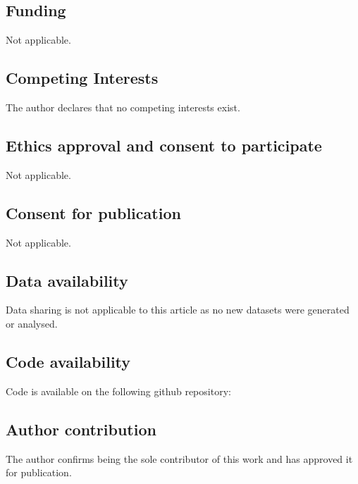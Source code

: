 \documentclass[pdflatex,sn-mathphys-ay]{sn-jnl}
\begin{document}
\subsection*{Funding}
Not applicable.

\subsection*{Competing Interests}
The author declares that no competing interests exist.

\subsection*{Ethics approval and consent to participate}
Not applicable.

\subsection*{Consent for publication}
Not applicable.

\subsection*{Data availability}
Data sharing is not applicable to this article as no new datasets were generated or analysed.

\subsection*{Code availability}
Code is available on the following github repository: 

\subsection*{Author contribution}
The author confirms being the sole contributor of this work and has approved it for publication.



\end{document}
